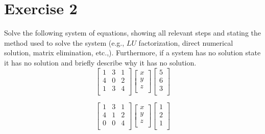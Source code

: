 \documentclass[12pt]{article}
\begin{document}
\section{Exercise 2}
Solve the following system of equations, showing all relevant steps and
stating the method used to solve the system (e.g., $LU$ factorization,
direct numerical solution, matrix elimination, etc.,).  Furthermore, if a
system has no solution state it has no solution and briefly describe why it
has no solution. 
\begin{equation}
    \begin{bmatrix}
        1       &   3       &   1   \\
        4       &   0       &   2   \\
        1       &   3       &   4   \\
    \end{bmatrix}
    \begin{bmatrix}
        x       \\
        y       \\
        z       \\
    \end{bmatrix}
    \begin{bmatrix}
        5       \\
        6       \\
        3       \\
    \end{bmatrix}
\end{equation}

\begin{equation}
    \begin{bmatrix}
        1       &   3       &   1   \\
        4       &   1       &   2   \\
        0       &   0       &   4   \\
    \end{bmatrix}
    \begin{bmatrix}
        x       \\
        y       \\
        z       \\
    \end{bmatrix}
    \begin{bmatrix}
        1       \\
        2       \\
        1       \\
    \end{bmatrix}
\end{equation}
\end{document}
